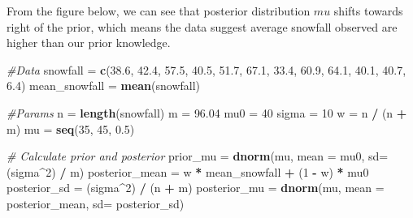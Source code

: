 \documentclass[
]{article}
\newenvironment{Shaded}{\begin{snugshade}}{\end{snugshade}}
\newcommand{\CommentTok}[1]{\textcolor[rgb]{0.56,0.35,0.01}{\textit{#1}}}
\newcommand{\DataTypeTok}[1]{\textcolor[rgb]{0.13,0.29,0.53}{#1}}
\newcommand{\DecValTok}[1]{\textcolor[rgb]{0.00,0.00,0.81}{#1}}
\newcommand{\FloatTok}[1]{\textcolor[rgb]{0.00,0.00,0.81}{#1}}
\newcommand{\KeywordTok}[1]{\textcolor[rgb]{0.13,0.29,0.53}{\textbf{#1}}}
\newcommand{\NormalTok}[1]{#1}
\newcommand{\OperatorTok}[1]{\textcolor[rgb]{0.81,0.36,0.00}{\textbf{#1}}}
\newcommand{\StringTok}[1]{\textcolor[rgb]{0.31,0.60,0.02}{#1}}
\begin{document}
From the figure below, we can see that posterior distribution \(mu\)
shifts towards right of the prior, which means the data suggest average
snowfall observed are higher than our prior knowledge.

\begin{Shaded}
\begin{Highlighting}[]
\CommentTok{#Data}
\NormalTok{snowfall =}\StringTok{ }\KeywordTok{c}\NormalTok{(}\FloatTok{38.6}\NormalTok{, }\FloatTok{42.4}\NormalTok{, }\FloatTok{57.5}\NormalTok{, }\FloatTok{40.5}\NormalTok{, }\FloatTok{51.7}\NormalTok{, }\FloatTok{67.1}\NormalTok{, }\FloatTok{33.4}\NormalTok{, }\FloatTok{60.9}\NormalTok{, }\FloatTok{64.1}\NormalTok{, }\FloatTok{40.1}\NormalTok{, }\FloatTok{40.7}\NormalTok{, }\FloatTok{6.4}\NormalTok{)}
\NormalTok{mean_snowfall =}\StringTok{ }\KeywordTok{mean}\NormalTok{(snowfall)}

\CommentTok{#Params}
\NormalTok{n =}\StringTok{ }\KeywordTok{length}\NormalTok{(snowfall)}
\NormalTok{m =}\StringTok{ }\FloatTok{96.04}
\NormalTok{mu0 =}\StringTok{ }\DecValTok{40}
\NormalTok{sigma =}\StringTok{ }\DecValTok{10}
\NormalTok{w =}\StringTok{ }\NormalTok{n }\OperatorTok{/}\StringTok{ }\NormalTok{(n }\OperatorTok{+}\StringTok{ }\NormalTok{m)}
\NormalTok{mu =}\StringTok{ }\KeywordTok{seq}\NormalTok{(}\DecValTok{35}\NormalTok{, }\DecValTok{45}\NormalTok{, }\FloatTok{0.5}\NormalTok{)}

\CommentTok{# Calculate prior and posterior}
\NormalTok{prior_mu =}\StringTok{ }\KeywordTok{dnorm}\NormalTok{(mu, }\DataTypeTok{mean =}\NormalTok{ mu0, }\DataTypeTok{sd=}\NormalTok{ (sigma}\OperatorTok{^}\DecValTok{2}\NormalTok{) }\OperatorTok{/}\StringTok{ }\NormalTok{m)}
\NormalTok{posterior_mean =}\StringTok{ }\NormalTok{w }\OperatorTok{*}\StringTok{ }\NormalTok{mean_snowfall }\OperatorTok{+}\StringTok{ }\NormalTok{(}\DecValTok{1} \OperatorTok{-}\StringTok{ }\NormalTok{w) }\OperatorTok{*}\StringTok{ }\NormalTok{mu0}
\NormalTok{posterior_sd =}\StringTok{ }\NormalTok{(sigma}\OperatorTok{^}\DecValTok{2}\NormalTok{) }\OperatorTok{/}\StringTok{ }\NormalTok{(n }\OperatorTok{+}\StringTok{ }\NormalTok{m)}
\NormalTok{posterior_mu =}\StringTok{ }\KeywordTok{dnorm}\NormalTok{(mu, }\DataTypeTok{mean =}\NormalTok{ posterior_mean, }\DataTypeTok{sd=}\NormalTok{ posterior_sd)}


\end{Highlighting}
\end{Shaded}
\end{document}
